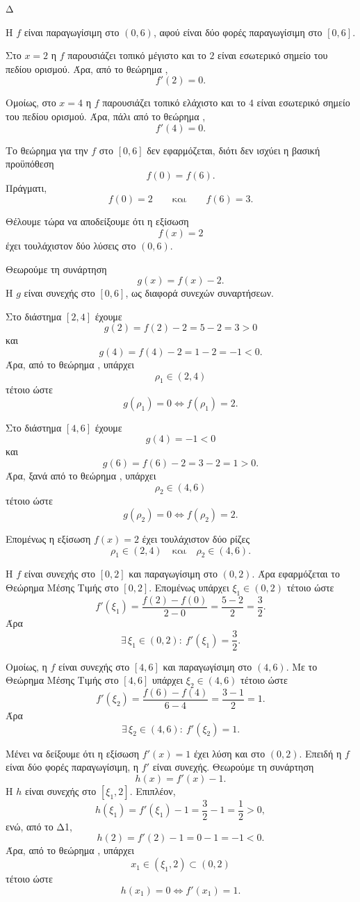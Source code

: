 \begin{thema}{Δ}
\begin{erwthma}
\item Η $f$ είναι παραγωγίσιμη στο $(0,6)$, αφού είναι δύο φορές
παραγωγίσιμη στο $[0,6]$.

Στο $x=2$ η $f$ παρουσιάζει τοπικό μέγιστο και το $2$ είναι εσωτερικό
σημείο του πεδίου ορισμού. Άρα, από το θεώρημα ,
\[
{f'(2)=0}.
\]

Ομοίως, στο $x=4$ η $f$ παρουσιάζει τοπικό ελάχιστο και το $4$ είναι
εσωτερικό σημείο του πεδίου ορισμού. Άρα, πάλι από το θεώρημα
,
\[
{f'(4)=0}.
\]

\item Το θεώρημα  για την $f$ στο $[0,6]$ δεν εφαρμόζεται,
διότι δεν ισχύει η βασική προϋπόθεση
\[
f(0)=f(6).
\]
Πράγματι,
\[
f(0)=2
\qquad\text{και}\qquad
f(6)=3.
\]

Θέλουμε τώρα να αποδείξουμε ότι η εξίσωση
\[
f(x)=2
\]
έχει τουλάχιστον δύο λύσεις στο $(0,6)$.

Θεωρούμε τη συνάρτηση
\[
g(x)=f(x)-2.
\]
Η $g$ είναι συνεχής στο $[0,6]$, ως διαφορά συνεχών συναρτήσεων.

Στο διάστημα $[2,4]$ έχουμε
\[
g(2)=f(2)-2=5-2=3>0
\]
και
\[
g(4)=f(4)-2=1-2=-1<0.
\]
Άρα, από το θεώρημα , υπάρχει
\[
\rho_1\in(2,4)
\]
τέτοιο ώστε
\[
g(\rho_1)=0\Leftrightarrow f(\rho_1)=2.
\]

Στο διάστημα $[4,6]$ έχουμε
\[
g(4)=-1<0
\]
και
\[
g(6)=f(6)-2=3-2=1>0.
\]
Άρα, ξανά από το θεώρημα , υπάρχει
\[
\rho_2\in(4,6)
\]
τέτοιο ώστε
\[
g(\rho_2)=0\Leftrightarrow f(\rho_2)=2.
\]

Επομένως η εξίσωση $f(x)=2$ έχει τουλάχιστον δύο ρίζες
\[
{\rho_1\in(2,4)\quad\text{και}\quad \rho_2\in(4,6)}.
\]

\item Η $f$ είναι συνεχής στο $[0,2]$ και παραγωγίσιμη στο $(0,2)$.
Άρα εφαρμόζεται το Θεώρημα Μέσης Τιμής στο $[0,2]$. Επομένως υπάρχει
$\xi_1\in(0,2)$ τέτοιο ώστε
\[
f'(\xi_1)=\frac{f(2)-f(0)}{2-0}
=\frac{5-2}{2}
=\frac32.
\]
Άρα
\[
{\exists\,\xi_1\in(0,2):\ f'(\xi_1)=\frac32}.
\]

Ομοίως, η $f$ είναι συνεχής στο $[4,6]$ και παραγωγίσιμη στο $(4,6)$.
Με το Θεώρημα Μέσης Τιμής στο $[4,6]$ υπάρχει $\xi_2\in(4,6)$ τέτοιο ώστε
\[
f'(\xi_2)=\frac{f(6)-f(4)}{6-4}
=\frac{3-1}{2}
=1.
\]
Άρα
\[
{\exists\,\xi_2\in(4,6):\ f'(\xi_2)=1}.
\]

Μένει να δείξουμε ότι η εξίσωση $f'(x)=1$ έχει λύση και στο $(0,2)$.
Επειδή η $f$ είναι δύο φορές παραγωγίσιμη, η $f'$ είναι συνεχής.
Θεωρούμε τη συνάρτηση
\[
h(x)=f'(x)-1.
\]
Η $h$ είναι συνεχής στο $[\xi_1,2]$. Επιπλέον,
\[
h(\xi_1)=f'(\xi_1)-1=\frac32-1=\frac12>0,
\]
ενώ, από το Δ1,
\[
h(2)=f'(2)-1=0-1=-1<0.
\]
Άρα, από το θεώρημα , υπάρχει
\[
x_1\in(\xi_1,2)\subset(0,2)
\]
τέτοιο ώστε
\[
h(x_1)=0\Leftrightarrow f'(x_1)=1.
\]


\end{erwthma}
\end{thema}
